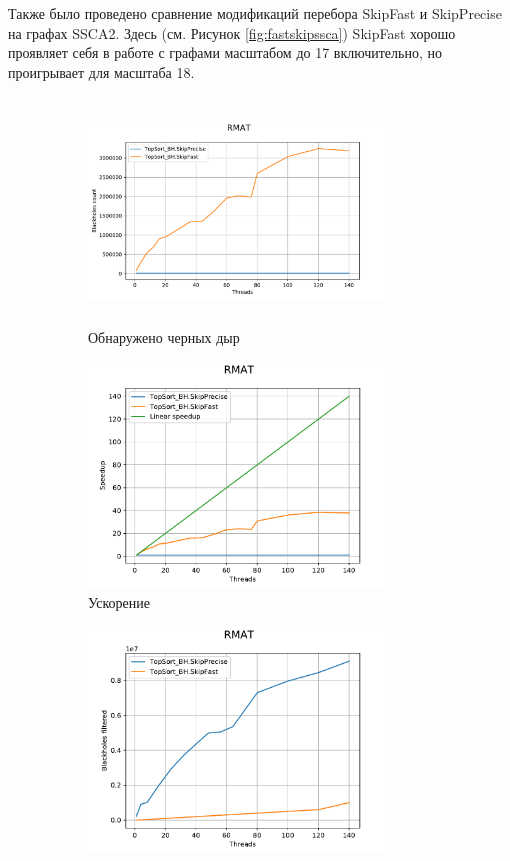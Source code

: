 \documentclass[12pt,a4paper,oneside,openany]{article}
\theoremstyle{definition}
\theoremstyle{lemma}
\theoremstyle{remark}
\begin{document}
Также было проведено сравнение модификаций перебора SkipFast и SkipPrecise на графах SSCA2.
Здесь (см. Рисунок \ref{fig:fastskipssca}) SkipFast хорошо проявляет себя в работе с графами
масштабом до 17 включительно, но проигрывает для масштаба 18.

\begin{figure}[H]
    \begin{subfigure}{.5\textwidth}
      \centering
      \includegraphics[width=8cm,height=6cm]{images/8_count.pdf}
      \caption{Обнаружено черных дыр}
      \label{fig:fastskipmanythreads:count}
    \end{subfigure}
    \begin{subfigure}{.5\textwidth}
      \centering
      \includegraphics[width=8cm]{images/8_count_speedup.pdf}
      \caption{Ускорение}
      \label{fig:fastskipmanythreads:countspeedup}
    \end{subfigure}
    \begin{subfigure}{.5\textwidth}
      \centering
      \includegraphics[width=8cm]{images/8_filtered.pdf}

\end{subfigure}
\end{figure}
\end{document}

